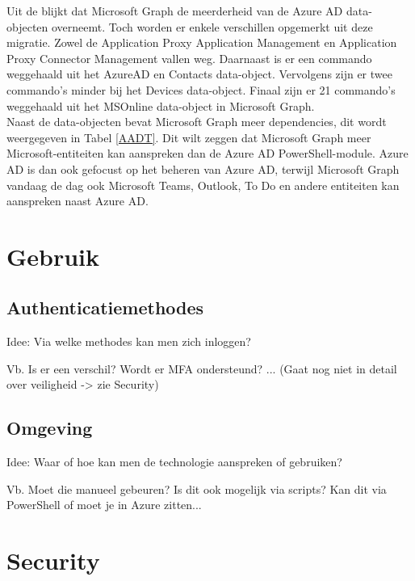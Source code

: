 Uit de blijkt dat Microsoft Graph de meerderheid van de Azure \ac{AD} data-objecten overneemt. Toch worden er enkele verschillen opgemerkt uit deze migratie. Zowel de Application Proxy Application Management en Application Proxy Connector Management vallen weg. Daarnaast is er een commando weggehaald uit het AzureAD en Contacts data-object. Vervolgens zijn er twee commando's minder bij het Devices data-object. Finaal zijn er 21 commando's weggehaald uit het MSOnline data-object in Microsoft Graph. \\

Naast de data-objecten bevat Microsoft Graph meer dependencies, dit wordt weergegeven in Tabel \ref{AADT}. Dit wilt zeggen dat Microsoft Graph meer Microsoft-entiteiten kan aanspreken dan de Azure \ac{AD} PowerShell-module. Azure \ac{AD} is dan ook gefocust op het beheren van Azure \ac{AD}, terwijl Microsoft Graph vandaag de dag ook Microsoft Teams, Outlook, To Do en andere entiteiten kan aanspreken naast Azure \ac{AD}.


\section{Gebruik}

\subsection{Authenticatiemethodes}

Idee: Via welke methodes kan men zich inloggen? 

Vb. Is er een verschil? Wordt er MFA ondersteund? ... (Gaat nog niet in detail over veiligheid -> zie Security)

\subsection{Omgeving}

Idee: Waar of hoe kan men de technologie aanspreken of gebruiken?

Vb. Moet die manueel gebeuren? Is dit ook mogelijk via scripts? Kan dit via PowerShell of moet je in Azure zitten...






\section{Security}

